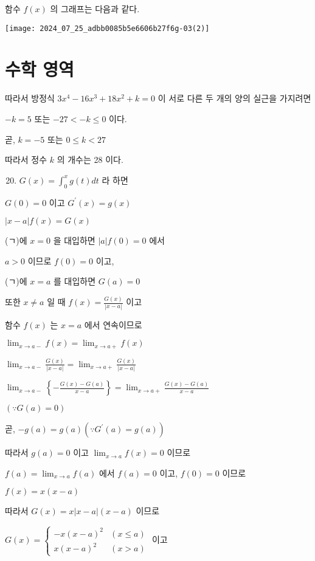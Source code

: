 \documentclass[10pt]{article}
\begin{document}
함수 $f(x)$ 의 그래프는 다음과 같다.

\begin{center}
\texttt{[image: 2024\_07\_25\_adbb0085b5e6606b27f6g-03(2)]}
\end{center}

\section*{수학 영역}
따라서 방정식 $3 x^{4}-16 x^{3}+18 x^{2}+k=0$ 이 서로 다른 두 개의 양의 실근을 가지려면

$-k=5$ 또는 $-27<-k \leq 0$ 이다.

곧, $k=-5$ 또는 $0 \leq k<27$

따라서 정수 $k$ 의 개수는 28 이다.

\begin{enumerate}
  \setcounter{enumi}{19}
  \item $G(x)=\int_{0}^{x} g(t) d t$ 라 하면
\end{enumerate}

$G(0)=0$ 이고 $G^{\prime}(x)=g(x)$

$|x-a| f(x)=G(x)$

(ㄱ)에 $x=0$ 을 대입하면 $|a| f(0)=0$ 에서

$a>0$ 이므로 $f(0)=0$ 이고,

(ㄱ)에 $x=a$ 를 대입하면 $G(a)=0$

또한 $x \neq a$ 일 때 $f(x)=\frac{G(x)}{|x-a|}$ 이고

함수 $f(x)$ 는 $x=a$ 에서 연속이므로

$\lim _{x \rightarrow a-} f(x)=\lim _{x \rightarrow a+} f(x)$

$\lim _{x \rightarrow a-} \frac{G(x)}{|x-a|}=\lim _{x \rightarrow a+} \frac{G(x)}{|x-a|}$

$\lim _{x \rightarrow a-}\left\{-\frac{G(x)-G(a)}{x-a}\right\}=\lim _{x \rightarrow a+} \frac{G(x)-G(a)}{x-a}$

$(\because G(a)=0)$

곧, $-g(a)=g(a)\left(\because G^{\prime}(a)=g(a)\right)$

따라서 $g(a)=0$ 이고 $\lim _{x \rightarrow a} f(x)=0$ 이므로

$f(a)=\lim _{x \rightarrow a} f(a)$ 에서 $f(a)=0$ 이고, $f(0)=0$ 이므로

$f(x)=x(x-a)$

따라서 $G(x)=x|x-a|(x-a)$ 이므로

$G(x)=\left\{\begin{array}{ll}-x(x-a)^{2} & (x \leq a) \\ x(x-a)^{2} & (x>a)\end{array}\right.$ 이고
\end{document}
